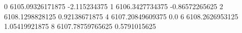 0 6105.09326171875 -2.115234375
1 6106.3427734375 -0.86572265625
2 6108.1298828125 0.92138671875
4 6107.20849609375 0.0
6 6108.2626953125 1.05419921875
8 6107.78759765625 0.5791015625

